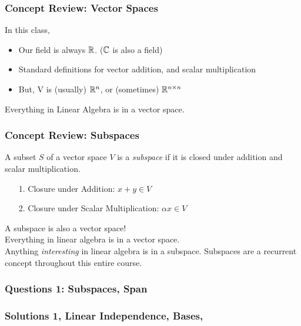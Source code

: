 \documentclass{beamer}
\begin{document}
\begin{frame}
\frametitle{Concept Review: Vector Spaces}
In this class,
\begin{itemize}
\item Our field is always $\mathbb{R}$. ($\mathbb{C}$ is also a field)
\item Standard definitions for vector addition, and scalar multiplication
\item But, V is (usually) $\mathbb{R}^n$, or (sometimes) $\mathbb{R}^{n\times n}$
\end{itemize}


Everything in Linear Algebra is in a vector space.
\end{frame}
\begin{frame}
\frametitle{Concept Review: Subspaces}
\begin{definition}[Subspace]
	A subset $S$ of a vector space $V$ is a \emph{subspace} if it is closed under addition and scalar multiplication.
	\begin{enumerate}
		\item[1.] Closure under Addition: $x+y \in V$
		\item[2.] Closure under Scalar Multiplication: $\alpha x \in V$
	\end{enumerate}
\end{definition}
A subspace is also a vector space!\\
Everything in linear algebra is in a vector space. \\ 
Anything \textit{interesting} in linear algebra is in a subspace.
Subspaces are a recurrent concept throughout this entire course.
\end{frame}
\begin{frame}
\frametitle{Questions 1: Subspaces, Span}

\end{frame}
\begin{frame}



\frametitle{Solutions 1, Linear Independence, Bases, }

\end{frame}
\end{document}
